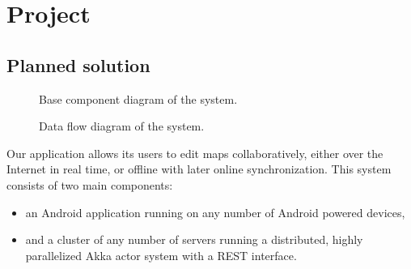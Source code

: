 %
%
%
%
%

\chapter{Project}
\label{chap:project}



\section{Planned solution}
\label{sec:plan}


\begin{figure}[h]
	\centering
	\caption{Base component diagram of the system.}
	\label{fig:diagram-components-system}
\end{figure}

\begin{figure}[h]
	\centering
	\caption{Data flow diagram of the system.}
	\label{fig:diagram-dfd}
\end{figure}

Our application allows its users to edit maps collaboratively, either over the Internet in real time, or offline with later online synchronization. This system consists of two main components:

\begin{itemize}
	\item an Android application running on any number of Android powered devices,
	\item and a cluster of any number of servers running a distributed, highly parallelized Akka actor system with a REST interface.
\end{itemize}





